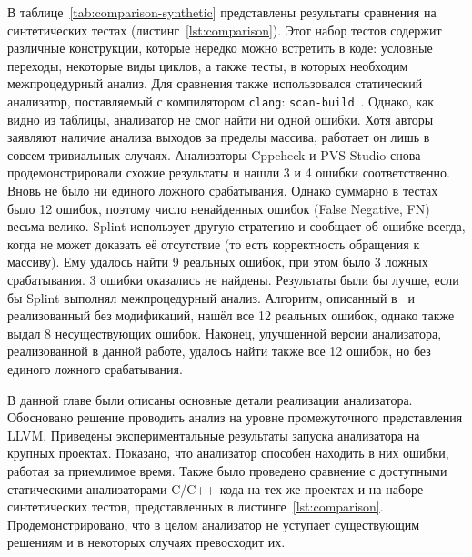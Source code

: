 В таблице~\ref{tab:comparison-synthetic} представлены результаты
сравнения на синтетических тестах (листинг~\ref{lst:comparison}). Этот
набор тестов содержит различные конструкции, которые нередко можно
встретить в коде: условные переходы, некоторые виды циклов, а также
тесты, в которых необходим межпроцедурный анализ. Для сравнения также
использовался статический анализатор, поставляемый с компилятором
\texttt{clang}: \texttt{scan-build}~\cite{scan-build}. Однако, как
видно из таблицы, анализатор не смог найти ни одной ошибки. Хотя
авторы заявляют наличие анализа выходов за пределы массива, работает
он лишь в совсем тривиальных случаях. Анализаторы Cppcheck и
PVS-Studio снова продемонстрировали схожие результаты и нашли 3 и 4
ошибки соответственно. Вновь не было ни единого ложного
срабатывания. Однако суммарно в тестах было 12 ошибок, поэтому число
ненайденных ошибок (False Negative, FN) весьма велико. Splint
использует другую стратегию и сообщает об ошибке всегда, когда не
может доказать её отсутствие (то есть корректность обращения к
массиву). Ему удалось найти 9 реальных ошибок, при этом было 3 ложных
срабатывания. 3 ошибки оказались не найдены. Результаты были бы лучше,
если бы Splint выполнял межпроцедурный анализ. Алгоритм, описанный
в~\cite{li2010practical} и реализованный без модификаций, нашёл все 12
реальных ошибок, однако также выдал 8 несуществующих ошибок. Наконец,
улучшенной версии анализатора, реализованной в данной работе, удалось
найти также все 12 ошибок, но без единого ложного срабатывания.

\chapterconclusion

В данной главе были описаны основные детали реализации
анализатора. Обосновано решение проводить анализ на уровне
промежуточного представления LLVM.  Приведены экспериментальные
результаты запуска анализатора на крупных проектах. Показано, что
анализатор способен находить в них ошибки, работая за приемлимое
время. Также было проведено сравнение с доступными статическими
анализаторами C/C++ кода на тех же проектах и на наборе синтетических
тестов, представленных в
листинге~\ref{lst:comparison}. Продемонстрировано, что в целом
анализатор не уступает существующим решениям и в некоторых случаях
превосходит их.

